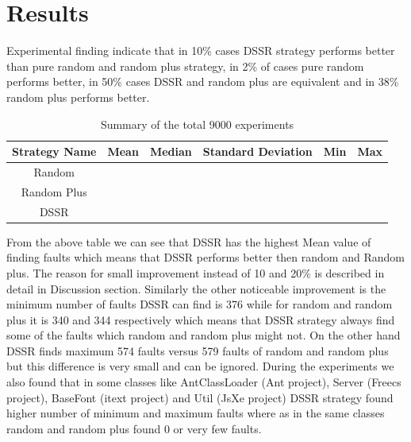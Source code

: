 \documentclass[conference]{IEEEtran}
\begin{document}

\section{Results}

Experimental finding indicate that in 10\% cases DSSR strategy performs better than pure random and random plus strategy, in 2\% of cases pure random performs better, in 50\% cases DSSR and random plus are equivalent and in 38\% random plus performs better. 


\begin{table} [ht]
\caption{Summary of the total 9000 experiments }
\center
\begin{tabular} {|c|c|c|c|c|c|}
\hline\hline
Strategy Name & Mean & Median & Standard Deviation & Min & Max \\[1ex]
\hline
Random  &   &  &  &  & \\
Random Plus  &   &  &  &  & \\
DSSR &  &  &  &  & \\
\hline
\end{tabular}
\label{table:TestResults}
\end{table}

From the above table we can see that DSSR has the highest Mean value of finding faults which means that DSSR performs better then random and Random plus. The reason for small improvement instead of 10 and 20\% is described in detail in Discussion section. Similarly the other noticeable improvement is the minimum number of faults DSSR can find is 376 while for random and random plus it is 340 and 344 respectively which means that DSSR strategy always find some of the faults which random and random plus might not. On the other hand DSSR finds maximum 574 faults versus 579 faults of random and random plus but this difference is very small and can be ignored. During the experiments we also found that in some classes like AntClassLoader (Ant project),  Server (Freecs project), BaseFont (itext project) and Util (JsXe project) DSSR strategy found higher number of minimum and maximum faults where as in the same classes random and random plus found 0 or very few faults.  \\
\end{document}
